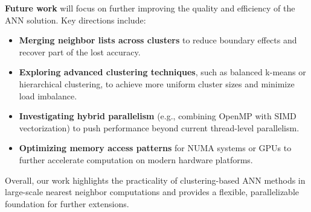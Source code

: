 \documentclass{article}
\begin{document}
\textbf{Future work} will focus on further improving the quality and efficiency of the ANN solution. 
Key directions include:
\begin{itemize}
    \item \textbf{Merging neighbor lists across clusters} to reduce boundary effects and recover part 
    of the lost accuracy.
    \item \textbf{Exploring advanced clustering techniques}, such as balanced k-means or hierarchical 
    clustering, to achieve more uniform cluster sizes and minimize load imbalance.
    \item \textbf{Investigating hybrid parallelism} (e.g., combining OpenMP with SIMD vectorization) 
    to push performance beyond current thread-level parallelism.
    \item \textbf{Optimizing memory access patterns} for NUMA systems or GPUs to further accelerate 
    computation on modern hardware platforms.
\end{itemize}

Overall, our work highlights the practicality of clustering-based ANN methods in large-scale nearest 
neighbor computations and provides a flexible, parallelizable foundation for further extensions.
\end{document}
